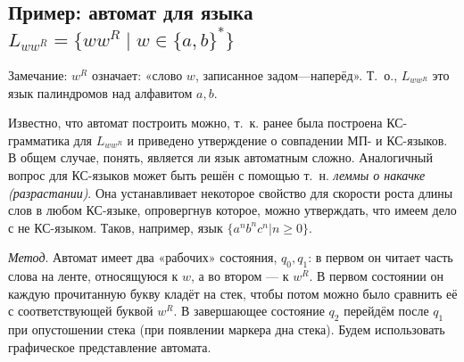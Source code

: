 \documentclass[12pt]{article}
\begin{document}
\subsection*{Пример: автомат для языка $L_{ww^R}=\{ww^R \mid w\in \{a,b\}^*\}$}
Замечание: $w^R$ означает: «слово $w$, записанное задом—наперёд». Т.~о., $L_{ww^R}$ это язык палиндромов над алфавитом ${a,b}$.


Известно, что автомат построить можно, т.~к. ранее была построена КС-грамматика для $L_{ww^R}$ и приведено утверждение о совпадении МП- и КС-языков. В общем случае, понять, является ли язык автоматным сложно. Аналогичный вопрос для КС-языков может быть решён с помощью т.~н. \emph{леммы о накачке (разрастании)}. Она устанавливает некоторое свойство для скорости роста длины слов в любом КС-языке, опровергнув которое, можно утверждать, что имеем дело с не КС-языком. Таков, например, язык $\{a^nb^nc^n|n\geqslant0\}$.

\emph{Метод}. Автомат имеет два «рабочих» состояния, $q_0, q_1$: в первом он читает часть слова на ленте, относящуюся к $w$, а во втором — к $w^R$. В первом состоянии он каждую прочитанную букву кладёт на стек, чтобы потом можно было сравнить её с соответствующей буквой $w^R$. В завершающее состояние $q_2$ перейдём после $q_1$ при опустошении стека (при появлении маркера дна стека). Будем использовать графическое представление автомата.

\end{document}
